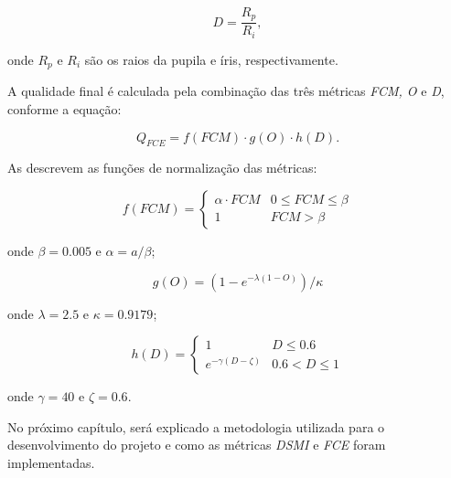 \begin{equation}\label{eq:fce:D}
    D = \frac{R_{p}}{R_{i}},
\end{equation}

\noindent onde $R_{p}$ e $R_{i}$ são os raios da pupila e íris, respectivamente.

\par A qualidade final é calculada pela combinação das três métricas \textit{FCM, O} e \textit{D}, conforme a equação:

\begin{equation} \label{eq:fce:Q}
    Q_{FCE} = f(FCM) \cdot g(O) \cdot h(D).
\end{equation}

As  descrevem as funções de normalização das métricas:

\begin{equation}\label{eq:fce:normFCM}
  f(FCM) =
  \begin{cases}
    \alpha \cdot FCM & 0 \leq FCM \leq \beta\\
    1  &  FCM > \beta
  \end{cases}
\end{equation}

\noindent onde $\beta = 0.005$ e $\alpha = a/\beta$;


\begin{equation}\label{eq:fce:normO}
  g(O) = (1 - e^{-\lambda(1 - O)})/\kappa
\end{equation}

\noindent onde $\lambda = 2.5$ e $\kappa = 0.9179$;

\begin{equation}\label{eq:fce:normD}
  h(D) =
  \begin{cases}
    1 & D \leq 0.6\\
    e^{-\gamma(D - \zeta)}  &  0.6 < D \leq 1
  \end{cases}
\end{equation}

\noindent onde $\gamma = 40$ e $\zeta = 0.6$.

\par No próximo capítulo, será explicado a metodologia utilizada para o desenvolvimento do projeto e como as métricas \textit{\acrshort{DSMI}} e \textit{\acrshort{FCE}} foram implementadas.